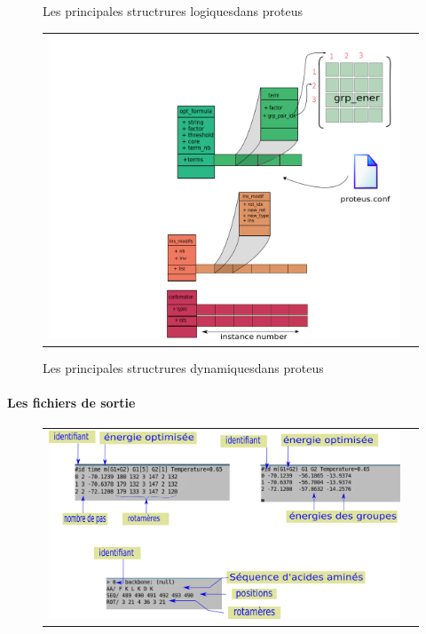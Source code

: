 \begin{enumerate}
\begin{figure}[!htbp]
     \caption{Les principales structrures \og logiques\fg dans proteus}
\label{graph:struct_log}
   \end{figure}



   \begin{figure}[!htbp]
     \centering
     \begin{tabular}{cc}
       \includegraphics[width=12cm]{figure/proteus/structures_dynamiques.png} &
     \end{tabular}
     
     \caption{Les principales structrures \og dynamiques\fg dans proteus}
\label{graph:struct_Dyna}
   \end{figure}

   

\paragraph{Les fichiers de sortie}
   
   \begin{figure}[!htbp]
     \centering
     \begin{tabular}{cc}
       \includegraphics[width=12cm]{figure/proteus/output.png} &
     \end{tabular}
     

\end{figure}
\end{enumerate}
